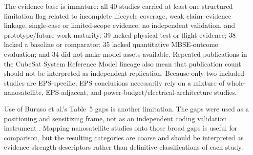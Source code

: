 The evidence base is immature: all 40 studies carried at least one structured limitation flag related to incomplete lifecycle coverage, weak claim--evidence linkage, single-case or limited-scope evidence, no independent validation, and prototype/future-work maturity; 39 lacked physical-test or flight evidence; 38 lacked a baseline or comparator; 35 lacked quantitative MBSE-outcome evaluation; and 34 did not make model assets available.  Repeated publications in the CubeSat System Reference Model lineage also mean that publication count should not be interpreted as independent replication.  Because only two included studies are EPS-specific, EPS conclusions necessarily rely on a mixture of whole-nanosatellite, EPS-adjacent, and power-budget/electrical-architecture studies.

Use of Buruso et al.'s Table~5 gaps is another limitation.  The gaps were used as a positioning and sensitizing frame, not as an independent coding validation instrument \cite{Buruso2026MBSESpace}.  Mapping nanosatellite studies onto those broad gaps is useful for comparison, but the resulting categories are coarse and should be interpreted as evidence-strength descriptors rather than definitive classifications of each study.

